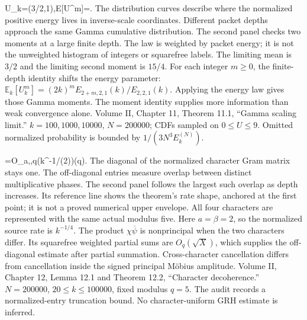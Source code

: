 {U_k=\Longrightarrow{}(3/2,1),\qquad \mathbb E[U^m]=.}
{The distribution curves describe where the normalized positive energy lives in inverse-scale coordinates. Different packet depths approach the same Gamma cumulative distribution. The second panel checks two moments at a large finite depth. The law is weighted by packet energy; it is not the unweighted histogram of integers or squarefree labels.}
{The limiting mean is $3/2$ and the limiting second moment is $15/4$. For each integer $m\ge0$, the finite-depth identity shifts the energy parameter: $\mathbb E_k[U_k^m]=(2k)^mE_{2+m,2,1}(k)/E_{2,2,1}(k)$. Applying the energy law gives those Gamma moments.}
{The moment identity supplies more information than weak convergence alone.}
{Volume II, Chapter 11, Theorem 11.1, ``Gamma scaling limit.'' $k=100,1000,10000$, $N=200000$; CDFs sampled on $0\le U\le9$. Omitted normalized probability is bounded by $1/(3N^3E_k^{(N)})$.}

{=O_{a,\beta,q}(k^{-1/(2\beta)})\qquad(\chi\ne\psi\bmod q).}
{The diagonal of the normalized character Gram matrix stays one. The off-diagonal entries measure overlap between distinct multiplicative phases. The second panel follows the largest such overlap as depth increases. Its reference line shows the theorem's rate shape, anchored at the first point; it is not a proved numerical upper envelope. All four characters are represented with the same actual modulus five.}
{Here $a=\beta=2$, so the normalized source rate is $k^{-1/4}$. The product $\chi\overline\psi$ is nonprincipal when the two characters differ. Its squarefree weighted partial sums are $O_q(\sqrt X)$, which supplies the off-diagonal estimate after partial summation.}
{Cross-character cancellation differs from cancellation inside the signed principal Möbius amplitude.}
{Volume II, Chapter 12, Lemma 12.1 and Theorem 12.2, ``Character decoherence.'' $N=200000$, $20\le k\le100000$, fixed modulus $q=5$. The audit records a normalized-entry truncation bound. No character-uniform GRH estimate is inferred.}


